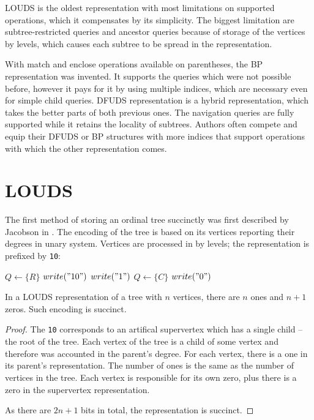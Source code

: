 LOUDS is the oldest representation with most limitations on supported operations, which it compensates by its simplicity.
The biggest limitation are subtree-restricted queries and ancestor queries because of storage of the vertices by levels, which causes each subtree to be spread in the representation.

With match and enclose operations available on parentheses, the BP representation was invented.
It supports the queries which were not possible before, however it pays for it by using multiple indices, which are necessary even for simple child queries.
DFUDS representation is a hybrid representation, which takes the better parts of both previous ones.
The navigation queries are fully supported while it retains the locality of subtrees.
Authors often compete and equip their DFUDS or BP structures with more indices that support operations with which the other representation comes.

\section{LOUDS}

The first method of storing an ordinal tree succinctly was first described by Jacobson in .
The encoding of the tree is based on its vertices reporting their degrees in unary system.
Vertices are processed in by levels; the representation is prefixed by \verb|10|:


\begin{algorithmic}
	\State $Q \gets \{R\}$ 
	\State $write("10")$
			\State $write("1")$
			\State $Q \gets \{C\}$
		\EndFor
		\State $write("0")$
	\EndWhile
\EndFunction
\end{algorithmic}

\begin{lemma}
	In a LOUDS representation of a tree with $n$ vertices, there are $n$ ones and $n+1$ zeros.
	Such encoding is succinct.
\end{lemma}
\begin{proof}
	The \verb|10| corresponds to an artifical supervertex which has a single child -- the root of the tree.
	Each vertex of the tree is a child of some vertex and therefore was accounted in the parent's degree.
	For each vertex, there is a one in its parent's representation.
	The number of ones is the same as the number of vertices in the tree.
	Each vertex is responsible for its own zero, plus there is a zero in the supervertex representation.
	
	As there are $2n+1$ bits in total, the representation is succinct.
\end{proof}

